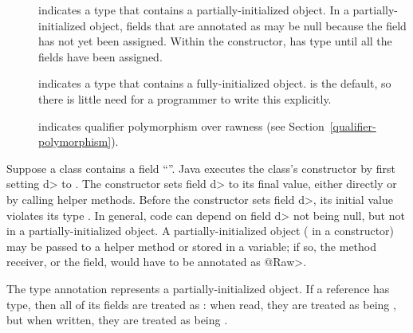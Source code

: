 \begin{description}

\item[]
  indicates a type that contains a partially-initialized object.  In a
  partially-initialized object, fields that are annotated as
   may be null because the field
  has not yet been assigned.  Within the constructor,
   has  type until all
  the fields have been assigned.

\item[]
  indicates a type that contains a fully-initialized object.  
  is the default, so there is little need for a programmer to write this
  explicitly.

\item[]
  indicates qualifier polymorphism over rawness (see
  Section~\ref{qualifier-polymorphism}).

\end{description}

Suppose a class contains a field ``''.  Java executes the class's constructor by first setting \<d> to
.  The constructor sets field \<d> to its final value, either
directly or by calling helper methods.  Before the constructor sets field
\<d>, its initial value  violates its type .
In general, code can depend on field \<d> not being null, but not in a
partially-initialized object.  A partially-initialized object (
in a constructor) may be passed to a helper method or stored in a variable;
if so, the method receiver, or the field, would have to be annotated as
\<@Raw>.


The  type annotation represents a
partially-initialized object.  If a reference has
 type, then all of its  fields are treated as
:  when read, they are
treated as being , but when
written, they are treated as being
.


